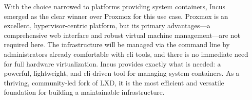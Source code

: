 With the choice narrowed to platforms providing system containers, Incus emerged as the clear winner over Proxmox for this use case. Proxmox is an excellent, hypervisor-centric platform, but its primary advantages—a comprehensive web interface and robust virtual machine management—are not required here. The infrastructure will be managed via the command line by administrators already comfortable with \gls{cli} tools, and there is no immediate need for full hardware virtualization. Incus provides exactly what is needed: a powerful, lightweight, and \gls{cli}-driven tool for managing system containers. As a thriving, community-led fork of LXD, it is the most efficient and versatile foundation for building a maintainable infrastructure.
